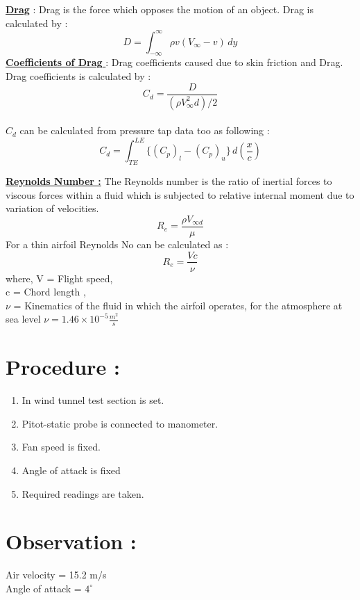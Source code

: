 \documentclass[12pt,a4paper]{article}
\begin{document}
\underline{\textbf{Drag}} : Drag is the force which opposes the motion of an object.
Drag is calculated by : \\
$$D = \int_{-\infty}^{\infty} \rho v (V_{\infty}-v)\,dy $$
\underline{\textbf{Coefficients of Drag }} :
Drag coefficients caused due to skin friction and Drag. Drag coefficients is calculated by :
$$ C_d = \frac{D}{(\rho V_{\infty}^2 d)/2} $$ \\
$C_d$ can be calculated from pressure tap data too as following :
$$ C_d = \int_{TE}^{LE} \{(C_p)_{l} - (C_p)_{u}\} \,d(\frac{x}{c}) $$



\underline{\textbf{Reynolds Number :}}
The Reynolds number is the ratio of inertial forces to viscous forces within a fluid which is subjected to relative internal moment due to variation of velocities.
$$  R_e = \frac{\rho V_{\infty d}}{\mu} $$
For a thin airfoil Reynolds No can be calculated as :
$$ R_e = \frac{Vc}{\nu} $$
where, V = Flight speed,\\
c = Chord length ,\\
$\nu$ = Kinematics of the fluid in which the airfoil operates, for the atmosphere  at sea level $\nu =  1.46\times 10^{-5} \frac{m^{2}}{s} $\\







\section{Procedure :}
\begin{enumerate}
    \item In wind tunnel test section is set.
    \item Pitot-static probe is connected to manometer.
    \item Fan speed is fixed.
    \item Angle of attack is fixed
    \item Required readings are taken.
\end{enumerate}






\section{Observation :}
Air velocity = 15.2 m/s \\
Angle of attack = $4^{\circ}$
\end{document}
